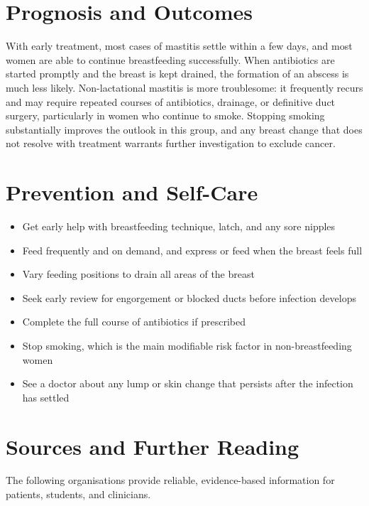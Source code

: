 \section*{Prognosis and Outcomes}
With early treatment, most cases of mastitis settle within a few days, and most women are able to continue breastfeeding successfully. When antibiotics are started promptly and the breast is kept drained, the formation of an abscess is much less likely. Non-lactational mastitis is more troublesome: it frequently recurs and may require repeated courses of antibiotics, drainage, or definitive duct surgery, particularly in women who continue to smoke. Stopping smoking substantially improves the outlook in this group, and any breast change that does not resolve with treatment warrants further investigation to exclude cancer.

\section*{Prevention and Self-Care}
\begin{itemize}
    \item Get early help with breastfeeding technique, latch, and any sore nipples
    \item Feed frequently and on demand, and express or feed when the breast feels full
    \item Vary feeding positions to drain all areas of the breast
    \item Seek early review for engorgement or blocked ducts before infection develops
    \item Complete the full course of antibiotics if prescribed
    \item Stop smoking, which is the main modifiable risk factor in non-breastfeeding women
    \item See a doctor about any lump or skin change that persists after the infection has settled
\end{itemize}

\section*{Sources and Further Reading}
The following organisations provide reliable, evidence-based information for patients, students, and clinicians.

